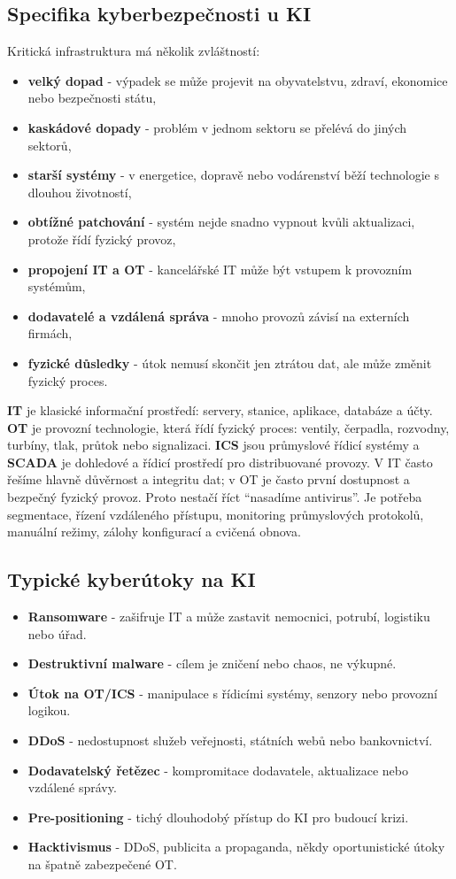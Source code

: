 \subsection*{Specifika kyberbezpečnosti u KI}
Kritická infrastruktura má několik zvláštností:
\begin{itemize}
  \item \textbf{velký dopad} - výpadek se může projevit na obyvatelstvu, zdraví, ekonomice nebo bezpečnosti státu,
  \item \textbf{kaskádové dopady} - problém v jednom sektoru se přelévá do jiných sektorů,
  \item \textbf{starší systémy} - v energetice, dopravě nebo vodárenství běží technologie s dlouhou životností,
  \item \textbf{obtížné patchování} - systém nejde snadno vypnout kvůli aktualizaci, protože řídí fyzický provoz,
  \item \textbf{propojení IT a OT} - kancelářské IT může být vstupem k provozním systémům,
  \item \textbf{dodavatelé a vzdálená správa} - mnoho provozů závisí na externích firmách,
  \item \textbf{fyzické důsledky} - útok nemusí skončit jen ztrátou dat, ale může změnit fyzický proces.
\end{itemize}

\textbf{IT} je klasické informační prostředí: servery, stanice, aplikace, databáze a účty. \textbf{OT} je provozní technologie, která řídí fyzický proces: ventily, čerpadla, rozvodny, turbíny, tlak, průtok nebo signalizaci. \textbf{ICS} jsou průmyslové řídicí systémy a \textbf{SCADA} je dohledové a řídicí prostředí pro distribuované provozy. V IT často řešíme hlavně důvěrnost a integritu dat; v OT je často první dostupnost a bezpečný fyzický provoz. Proto nestačí říct “nasadíme antivirus”. Je potřeba segmentace, řízení vzdáleného přístupu, monitoring průmyslových protokolů, manuální režimy, zálohy konfigurací a cvičená obnova.

\subsection*{Typické kyberútoky na KI}
\begin{itemize}
  \item \textbf{Ransomware} - zašifruje IT a může zastavit nemocnici, potrubí, logistiku nebo úřad.
  \item \textbf{Destruktivní malware} - cílem je zničení nebo chaos, ne výkupné.
  \item \textbf{Útok na OT/ICS} - manipulace s řídicími systémy, senzory nebo provozní logikou.
  \item \textbf{DDoS} - nedostupnost služeb veřejnosti, státních webů nebo bankovnictví.
  \item \textbf{Dodavatelský řetězec} - kompromitace dodavatele, aktualizace nebo vzdálené správy.
  \item \textbf{Pre-positioning} - tichý dlouhodobý přístup do KI pro budoucí krizi.
  \item \textbf{Hacktivismus} - DDoS, publicita a propaganda, někdy oportunistické útoky na špatně zabezpečené OT.
\end{itemize}


